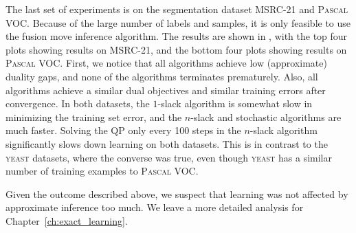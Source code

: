 The last set of experiments is on the segmentation dataset MSRC-21 and \textsc{Pascal
VOC}.  Because of the large number of labels and samples, it is only feasible
to use the fusion move inference algorithm. The results are shown in
, with the top four plots showing results on
MSRC-21, and the bottom four plots showing results on \textsc{Pascal VOC}.
First, we notice that all algorithms achieve low (approximate) duality gaps, and none
of the algorithms terminates prematurely. Also, all algorithms achieve a
similar dual objectives and similar training errors after convergence.
In both datasets, the $1$-slack algorithm is somewhat slow in minimizing the
training set error, and the $n$-slack and stochastic algorithms are much
faster. Solving the QP only every 100 steps in the $n$-slack algorithm significantly slows
down learning on both datasets. This is in contrast to the \textsc{yeast} datasets, where the converse was true,
even though \textsc{yeast} has a similar number of training examples to \textsc{Pascal VOC}.

Given the outcome described above, we suspect that learning was not affected by approximate
inference too much. We leave a more detailed analysis for Chapter~\ref{ch:exact_learning}.\pagebreak\\

